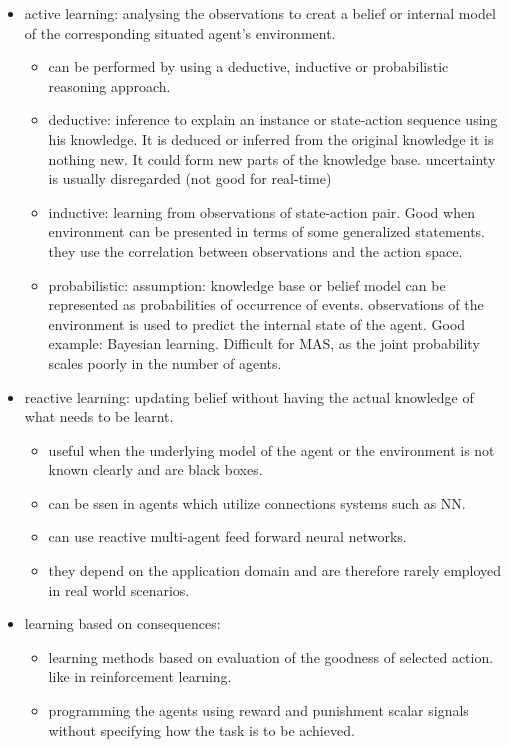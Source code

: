 \begin{itemize}[noitemsep,nolistsep]
	\item active learning: analysing the observations to creat a belief or internal model of the corresponding situated agent's environment. 
	\begin{itemize}[noitemsep,nolistsep]
		\item can be performed by using a deductive, inductive or probabilistic reasoning approach.
		\item deductive: inference to explain an instance or state-action sequence using his knowledge. It is deduced or inferred from the original knowledge it is nothing new. It could form new parts of the knowledge base. uncertainty is usually disregarded (not good for real-time)
		\item inductive: learning from observations of state-action pair. Good when environment can be presented in terms of some generalized statements. they use the correlation between observations and the action space.
		\item probabilistic: assumption: knowledge base or belief model can be represented as probabilities of occurrence of events. observations of the environment is used to predict the internal state of the agent. Good example: Bayesian learning. Difficult for MAS, as the joint probability scales poorly in the number of agents.
	\end{itemize}
	\item reactive learning: updating belief without having the actual knowledge of what needs to be learnt.
	\begin{itemize}[noitemsep,nolistsep]
		\item useful when the underlying model of the agent or the environment is not known clearly and are black boxes.
		\item can be ssen in agents which utilize connections systems such as NN.
		\item can use reactive multi-agent feed forward neural networks.
		\item they depend on the application domain and are therefore rarely employed in real world scenarios.
	\end{itemize}
	\item learning based on consequences:
	\begin{itemize}[noitemsep,nolistsep]
		\item learning methods based on evaluation of the goodness of selected action. like in reinforcement learning.
		\item programming the agents using reward and punishment scalar signals without specifying how the task is to be achieved.

\end{itemize}
\end{itemize}
